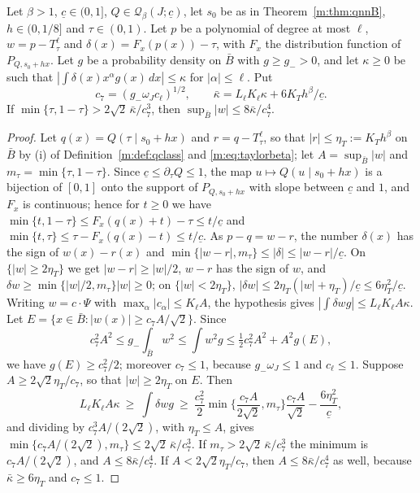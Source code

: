 \begin{lemma}\label{m:lem:qpoly}
Let $\beta>1$, $\underline c\in(0,1]$, $Q\in\mathcal Q_\beta(J;\underline c)$, let $s_0$ be as in Theorem~\ref{m:thm:qnnB}, $h\in(0,1/8]$ and $\tau\in(0,1)$. Let $p$ be a polynomial of degree at most $\ell$, $w=p-T^\ell_\tau$ and $\delta(x)=F_x(p(x))-\tau$, with $F_x$ the distribution function of $P_{Q,s_0+hx}$. Let $g$ be a probability density on $\bar B$ with $g\ge g_->0$, and let $\kappa\ge0$ be such that $|\int\delta(x)x^\alpha g(x)\,dx|\le\kappa$ for $|\alpha|\le\ell$. Put
\[
c_7=(g_-\omega_Jc_\ell)^{1/2},\qquad\bar\kappa=L_\ell K_\ell\kappa+6K_Th^\beta/\underline c .
\]
If $\min\{\tau,1-\tau\}>2\sqrt2\,\bar\kappa/c_7^3$, then $\sup_{\bar B}|w|\le8\bar\kappa/c_7^4$.
\end{lemma}

\begin{proof}
Let $q(x)=Q(\tau\mid s_0+hx)$ and $r=q-T^\ell_\tau$, so that $|r|\le\eta_T:=K_Th^\beta$ on $\bar B$ by (i) of Definition~\ref{m:def:qclass} and \eqref{m:eq:taylorbeta}; let $A=\sup_{\bar B}|w|$ and $m_\tau=\min\{\tau,1-\tau\}$. Since $\underline c\le\partial_\tau Q\le1$, the map $u\mapsto Q(u\mid s_0+hx)$ is a bijection of $[0,1]$ onto the support of $P_{Q,s_0+hx}$ with slope between $\underline c$ and $1$, and $F_x$ is continuous; hence for $t\ge0$ we have $\min\{t,1-\tau\}\le F_x(q(x)+t)-\tau\le t/\underline c$ and $\min\{t,\tau\}\le\tau-F_x(q(x)-t)\le t/\underline c$. As $p-q=w-r$, the number $\delta(x)$ has the sign of $w(x)-r(x)$ and $\min\{|w-r|,m_\tau\}\le|\delta|\le|w-r|/\underline c$. On $\{|w|\ge2\eta_T\}$ we get $|w-r|\ge|w|/2$, $w-r$ has the sign of $w$, and $\delta w\ge\min\{|w|/2,m_\tau\}|w|\ge0$; on $\{|w|<2\eta_T\}$, $|\delta w|\le2\eta_T(|w|+\eta_T)/\underline c\le6\eta_T^2/\underline c$. Writing $w=c\cdot\Psi$ with $\max_\alpha|c_\alpha|\le K_\ell A$, the hypothesis gives $|\int\delta wg|\le L_\ell K_\ell A\kappa$. Let $E=\{x\in\bar B:|w(x)|\ge c_7A/\sqrt2\}$. Since
\[
c_7^2A^2\le g_-\int_{\bar B}w^2\le\int w^2g\le\tfrac12c_7^2A^2+A^2g(E),
\]
we have $g(E)\ge c_7^2/2$; moreover $c_7\le1$, because $g_-\omega_J\le1$ and $c_\ell\le1$. Suppose $A\ge2\sqrt2\eta_T/c_7$, so that $|w|\ge2\eta_T$ on $E$. Then
\[
L_\ell K_\ell A\kappa\ \ge\ \int\delta wg\ \ge\ \frac{c_7^2}2\min\Big\{\frac{c_7A}{2\sqrt2},m_\tau\Big\}\frac{c_7A}{\sqrt2}-\frac{6\eta_T^2}{\underline c},
\]
and dividing by $c_7^3A/(2\sqrt2)$, with $\eta_T\le A$, gives $\min\{c_7A/(2\sqrt2),m_\tau\}\le2\sqrt2\,\bar\kappa/c_7^3$. If $m_\tau>2\sqrt2\,\bar\kappa/c_7^3$ the minimum is $c_7A/(2\sqrt2)$, and $A\le8\bar\kappa/c_7^4$. If $A<2\sqrt2\eta_T/c_7$, then $A\le8\bar\kappa/c_7^4$ as well, because $\bar\kappa\ge6\eta_T$ and $c_7\le1$.
\end{proof}

